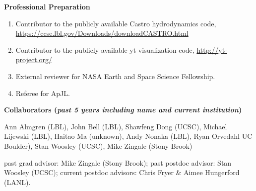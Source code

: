 \documentclass[11pt,letterpaper,english]{article}
\begin{document}
\begin{flushleft} {\bf Professional Preparation}
\begin{enumerate}
\item Contributor to the publicly available Castro hydrodynamics code,
  \url{https://ccse.lbl.gov/Downloads/downloadCASTRO.html} \\

\item Contributor to the publicly available yt visualization code,
  \url{http://yt-project.org/} \\

\item External reviewer for NASA Earth and Space Science Fellowship. \\ 
\item Referee for ApJL. \\ 
\end{enumerate} 

\vspace{-6pt}
{\bf Collaborators ({\emph{past 5 years including name and current institution}})} 
{\parindent 16pt


Ann Almgren (LBL), 
John Bell (LBL),
Shawfeng Dong (UCSC),
Michael Lijewski (LBL),
Haitao Ma (unknown),
Andy Nonaka (LBL), 
Ryan Orvedahl UC Boulder),
Stan Woosley (UCSC),
Mike Zingale (Stony Brook)

past grad advisor: Mike Zingale (Stony Brook); past postdoc advisor: Stan Woosley (UCSC); current postdoc advisors: Chris Fryer \& Aimee Hungerford (LANL).
}


\end{flushleft}
\end{document}
